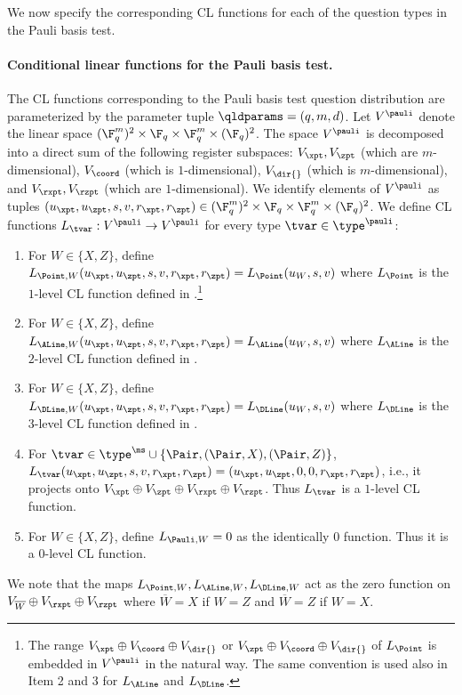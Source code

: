 We now specify the corresponding CL functions for each of the question types in
the Pauli basis test.

\paragraph{Conditional linear functions for the Pauli basis test.}
The CL functions corresponding to the Pauli basis test question distribution are
parameterized by the parameter tuple $\qldparams = (q,m,d)$.
Let $V^\pauli$ denote the linear space $(\F_q^m)^2 \times \F_q \times \F_q^m
\times (\F_q)^2$.
The space $V^\pauli$ is decomposed into a direct sum of the following register
subspaces: $V_\xpt,V_\zpt$ (which are $m$-dimensional), $V_\coord$ (which is
$1$-dimensional), $V_{\dir{}}$ (which is $m$-dimensional), and
$V_{\rxpt},V_{\rzpt}$ (which are $1$-dimensional).
We identify elements of $V^\pauli$ as tuples $(u_\xpt,u_\zpt,s,v,r_\xpt,r_\zpt)
\in (\F_q^m)^2 \times \F_q \times \F_q^m \times (\F_q)^2$.
We define CL functions $L_\tvar: V^\pauli \to V^\pauli$ for every type $\tvar
\in \type^\pauli$:
\begin{enumerate}
\item For $W \in \{X,Z\}$, define $L_{\Point,W}(u_\xpt,u_\zpt,s,v,r_\xpt,r_\zpt)
  = L_\Point(u_W,s,v)$ where $L_\Point$ is the $1$-level CL function defined in
  .\footnote{The range $V_{\xpt} \oplus V_\coord \oplus
    V_{\dir{}}$ or $V_{\zpt} \oplus V_\coord \oplus V_{\dir{}}$ of $L_\Point$ is
    embedded in $V^\pauli$ in the natural way.
    The same convention is used also in Item 2 and 3 for $L_\ALine$ and
    $L_\DLine$.}
\item For $W \in \{X,Z\}$, define $L_{\ALine,W}(u_\xpt,u_\zpt,s,v,r_\xpt,r_\zpt)
  = L_\ALine(u_W,s,v)$ where $L_\ALine$ is the $2$-level CL function defined in
  .
\item For $W \in \{X,Z\}$, define $L_{\DLine,W}(u_\xpt,u_\zpt,s,v,r_\xpt,r_\zpt)
  = L_\DLine(u_W,s,v)$ where $L_\DLine$ is the $3$-level CL function defined in
  .
\item For $\tvar \in \type^\ms \cup \{\Pair, (\Pair,X), (\Pair,Z) \}$,
  $L_{\tvar}(u_\xpt,u_\zpt,s,v,r_\xpt,r_\zpt) =
  (u_\xpt,u_\zpt,0,0,r_\xpt,r_\zpt)$, i.e., it projects onto $V_\xpt \oplus
  V_\zpt \oplus V_{\rxpt} \oplus V_{\rzpt}$.
  Thus $L_{\tvar}$ is a $1$-level CL function.
  
\item For $W \in \{X,Z\}$, define $L_{\Pauli,W} = 0$ as the identically $0$
  function.
  Thus it is a $0$-level CL function.

\end{enumerate}
We note that the maps $L_{\Point,W}, L_{\ALine,W}, L_{\DLine,W}$ act as the zero function
on $V_{\overline{W}} \oplus V_{\rxpt} \oplus V_{\rzpt}$ where $\overline{W} = X$
if $W = Z$ and $\overline{W} = Z$ if $W = X$.

